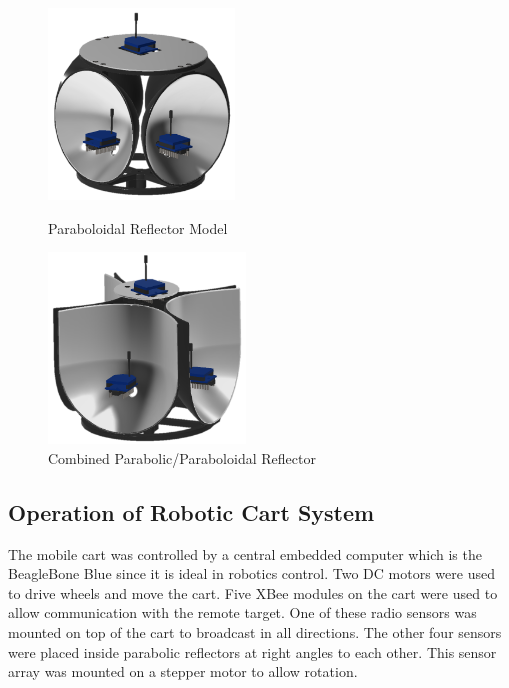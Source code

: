 \begin{figure}[h!]
  \centering
  \begin{minipage}[t]{0.5\textwidth}
    \centering
    \includegraphics[height=2in]{figs/img/paraboloidalReflector}
    \captionsetup{width=\textwidth, justification=raggedright}
    \caption{Paraboloidal Reflector Model}
    \label{fig:parabolodialReflector}
  \end{minipage}
  \begin{minipage}[t]{0.4\textwidth}
    \centering
    \includegraphics[height=2in]{figs/img/parabolicReflector}
    \captionsetup{width=\textwidth, justification=raggedright}
    \caption{Combined Parabolic/Paraboloidal Reflector}
    \label{fig:parabolicReflector1}
  \end{minipage}
\end{figure}

\subsection{Operation of Robotic Cart System}
The mobile cart was controlled by a central embedded computer which is the BeagleBone Blue since it is ideal in robotics control. Two DC motors were used to drive wheels and move the cart. Five XBee modules on the cart were used to allow communication with the remote target. One of these radio sensors was mounted on top of the cart to broadcast in all directions. The other four sensors were placed inside parabolic reflectors at right angles to each other. This sensor array was mounted on a stepper motor to allow rotation.



